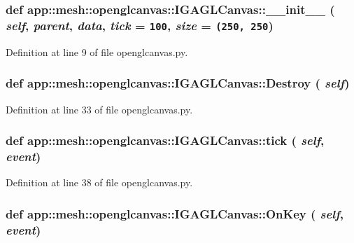 \subsubsection{\setlength{\rightskip}{0pt plus 5cm}def app::mesh::openglcanvas::IGAGLCanvas::\_\-\_\-init\_\-\_\- ( {\em self},  {\em parent},  {\em data},  {\em tick} = {\tt 100},  {\em size} = {\tt (250,~250})}\label{classapp_1_1mesh_1_1openglcanvas_1_1IGAGLCanvas_64c0c71434cfa23aa1bafd826ef4e2d3}




Definition at line 9 of file openglcanvas.py.
\subsubsection{\setlength{\rightskip}{0pt plus 5cm}def app::mesh::openglcanvas::IGAGLCanvas::Destroy ( {\em self})}\label{classapp_1_1mesh_1_1openglcanvas_1_1IGAGLCanvas_67556b11322d8b77a6849b997132b0bb}




Definition at line 33 of file openglcanvas.py.
\subsubsection{\setlength{\rightskip}{0pt plus 5cm}def app::mesh::openglcanvas::IGAGLCanvas::tick ( {\em self},  {\em event})}\label{classapp_1_1mesh_1_1openglcanvas_1_1IGAGLCanvas_836884741d9595b54b130ee2b4d2a513}




Definition at line 38 of file openglcanvas.py.
\subsubsection{\setlength{\rightskip}{0pt plus 5cm}def app::mesh::openglcanvas::IGAGLCanvas::OnKey ( {\em self},  {\em event})}\label{classapp_1_1mesh_1_1openglcanvas_1_1IGAGLCanvas_c952f3f75fdc78d7b70a0aa50466d827}




